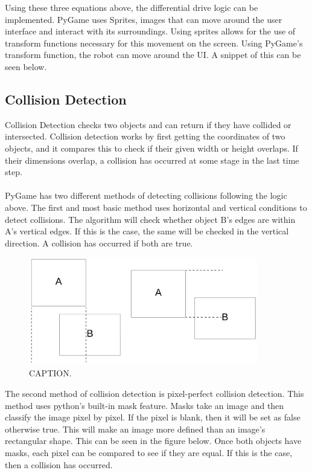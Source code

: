 \documentclass[12pt]{article}
\begin{document}
Using these three equations above, the differential drive logic can be implemented. PyGame uses Sprites, images that can move around the user interface and interact with its surroundings. Using sprites allows for the use of transform functions necessary for this movement on the screen. Using PyGame's transform function, the robot can move around the UI. A snippet of this can be seen below.

\subsection{Collision Detection}
Collision Detection checks two objects and can return if they have collided or intersected. Collision detection works by first getting the coordinates of two objects, and it compares this to check if their given width or height overlaps. If their dimensions overlap, a collision has occurred at some stage in the last time step.
\\\\
PyGame has two different methods of detecting collisions following the logic above. The first and most basic method uses horizontal and vertical conditions to detect collisions. The algorithm will check whether object B's edges are within A's vertical edges. If this is the case, the same will be checked in the vertical direction. A collision has occurred if both are true.

 \begin{figure}[H]
 \label{fig:}
 \centering
 \includegraphics[width=10cm]{imgs/RectCollision.png}
 \caption{CAPTION.}
 \end{figure}


The second method of collision detection is pixel-perfect collision detection. This method uses python's built-in mask feature. Masks take an image and then classify the image pixel by pixel. If the pixel is blank, then it will be set as false otherwise true. This will make an image more defined than an image’s rectangular shape. This can be seen in the figure below. Once both objects have masks, each pixel can be compared to see if they are equal. If this is the case, then a collision has occurred.
\end{document}
